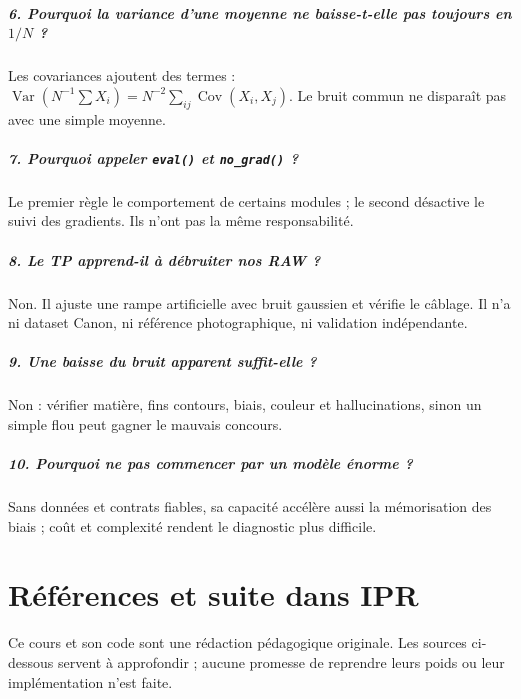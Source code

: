 \documentclass[12pt,a4paper,oneside]{report}
\begin{document}
\paragraph{6. Pourquoi la variance d'une moyenne ne baisse-t-elle pas toujours en $1/N$ ?}
Les covariances ajoutent des termes :
$\operatorname{Var}(N^{-1}\sum X_i)=N^{-2}\sum_{ij}\operatorname{Cov}(X_i,X_j)$.
Le bruit commun ne disparaît pas avec une simple moyenne.

\paragraph{7. Pourquoi appeler \texttt{eval()} et \texttt{no\_grad()} ?}
Le premier règle le comportement de certains modules ; le second désactive
le suivi des gradients. Ils n'ont pas la même responsabilité.

\paragraph{8. Le TP apprend-il à débruiter nos RAW ?}
Non. Il ajuste une rampe artificielle avec bruit gaussien et vérifie le câblage.
Il n'a ni dataset Canon, ni référence photographique, ni validation indépendante.

\paragraph{9. Une baisse du bruit apparent suffit-elle ?}
Non : vérifier matière, fins contours, biais, couleur et hallucinations,
sinon un simple flou peut gagner le mauvais concours.

\paragraph{10. Pourquoi ne pas commencer par un modèle énorme ?}
Sans données et contrats fiables, sa capacité accélère aussi la mémorisation
des biais ; coût et complexité rendent le diagnostic plus difficile.

\chapter{Références et suite dans IPR}

Ce cours et son code sont une rédaction pédagogique originale. Les sources
ci-dessous servent à approfondir ; aucune promesse de reprendre leurs poids
ou leur implémentation n'est faite.
\end{document}
